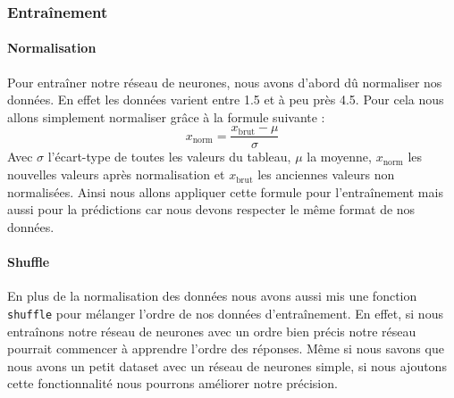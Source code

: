 \documentclass[a4paper,11pt]{article}
\begin{document}
\subsubsection{Entraînement}
\paragraph{Normalisation}
Pour entraîner notre réseau de neurones, nous avons d'abord dû normaliser nos données. En effet les données varient entre 1.5 et à peu près 4.5. Pour cela nous allons simplement normaliser grâce à la formule suivante : 
\begin{equation}
	x_{\text{norm}} = \frac{x_{\text{brut}} - \mu}{\sigma}
\end{equation}
Avec $\sigma$ l'écart-type de toutes les valeurs du tableau, $\mu$ la moyenne, $x_{\text{norm}}$ les nouvelles valeurs après normalisation et $x_{\text{brut}}$ les anciennes valeurs non normalisées. Ainsi nous allons appliquer cette formule pour l'entraînement mais aussi pour la prédictions car nous devons respecter le même format de nos données. 

\paragraph{Shuffle}
En plus de la normalisation des données nous avons aussi mis une fonction \texttt{shuffle} pour mélanger l'ordre de nos données d'entraînement. En effet, si nous entraînons notre réseau de neurones avec un ordre bien précis notre réseau pourrait commencer à apprendre l'ordre des réponses. Même si nous savons que nous avons un petit dataset avec un réseau de neurones simple, si nous ajoutons cette fonctionnalité nous pourrons améliorer notre précision.
\end{document}
